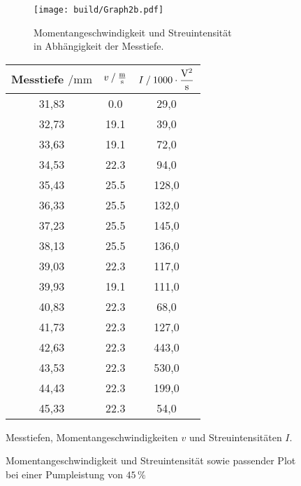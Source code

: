 \begin{figure}[H]
    \begin{subfigure}{0.57\textwidth} 
        \centering
        \texttt{[image: build/Graph2b.pdf]} 
        \caption{Momentangeschwindigkeit und Streuintensität \\ in Abhängigkeit der Messtiefe.}
        \label{fig:graph2b}
        \qquad
    \end{subfigure}
    \begin{subtable}{0.43\textwidth}
        \centering
       \begin{tabular}{c c c}
        \toprule 
        {Messtiefe $\mathbin{/} \unit{\milli\meter}$} & {$v \mathbin{/} \unit{\frac{\meter}{\second}} $} & {$I \mathbin{/} 1000 \cdot \unit{\dfrac{\volt^2}{\second}}$}  \\
        \midrule 
            31,83      &  0.0      &29,0    \\
            32,73      &  19.1     &39,0    \\
            33,63      &  19.1     &72,0    \\
            34,53      &  22.3     &94,0    \\
            35,43      &  25.5     &128,0   \\
            36,33      &  25.5     &132,0   \\
            37,23      &  25.5     &145,0   \\
            38,13      &  25.5     &136,0   \\
            39,03      &  22.3     &117,0   \\
            39,93      &  19.1     &111,0   \\
            40,83      &  22.3     &68,0    \\
            41,73      &  22.3     &127,0   \\
            42,63      &  22.3     &443,0   \\
            43,53      &  22.3     &530,0   \\
            44,43      &  22.3     &199,0   \\
            45,33      &  22.3     &54,0    \\
        \bottomrule
    \end{tabular} 
    \caption{Messtiefen, Momentangeschwindigkeiten $v$ und Streuintensitäten $I$.}
     \label{tab:2b}  
 \end{subtable}
 \caption{Momentangeschwindigkeit und Streuintensität sowie passender Plot bei einer Pumpleistung von $45 \,\%$} 
\end{figure}     



